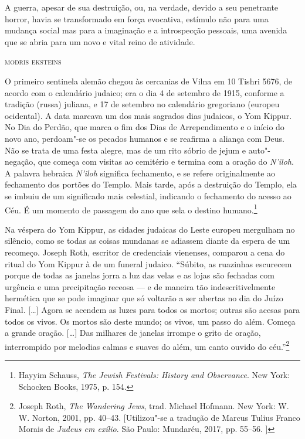 \epigraph{A guerra, apesar de sua destruição, ou, na verdade, devido a seu
penetrante horror, havia se transformado em força evocativa, estímulo
não para uma mudança social mas para a imaginação e a introspecção
pessoais, uma avenida que se abria para um novo e vital reino de
atividade.}{\textsc{modris eksteins}}

O primeiro sentinela alemão chegou às cercanias de Vilna em 10 Tishri
5676, de acordo com o calendário judaico; era o dia 4 de setembro de
1915, conforme a tradição (russa) juliana, e 17 de setembro no
calendário gregoriano (europeu ocidental). A data marcava um dos mais
sagrados dias judaicos, o Yom Kippur. No Dia do Perdão, que marca o fim
dos Dias de Arrependimento e o início do novo ano, perdoam"-se os pecados
humanos e se reafirma a aliança com Deus. Não se trata de uma festa
alegre, mas de um rito sóbrio de jejum e auto"-negação, que começa com
visitas ao cemitério e termina com a oração do \emph{N'iloh}. A palavra
hebraica \emph{N'iloh} significa fechamento, e se refere originalmente
ao fechamento dos portões do Templo. Mais tarde, após a destruição do
Templo, ela se imbuiu de um significado mais celestial, indicando o
fechamento do acesso ao Céu. É um momento de passagem do ano que sela o
destino humano.\footnote{Hayyim Schauss, \emph{The Jewish Festivals:
  History and Observance}. New York: Schocken Books, 1975, p. 154.}

Na véspera do Yom Kippur, as cidades judaicas do Leste europeu mergulham
no silêncio, como se todas as coisas mundanas se adiassem diante da
espera de um recomeço. Joseph Roth, escritor de credenciais vienenses,
comparou a cena do ritual do Yom Kippur à de um funeral judaico.
``Súbito, as ruazinhas escurecem porque de todas as janelas jorra a luz
das velas e as lojas são fechadas com urgência e uma precipitação
receosa --- e de maneira tão indescritivelmente hermética que se pode
imaginar que só voltarão a ser abertas no dia do Juízo Final.
{[}\ldots{}{]} Agora se acendem as luzes para todos os mortos; outras
são acesas para todos os vivos. Os mortos são deste mundo; os vivos, um
passo do além. Começa a grande oração. {[}\ldots{}{]} Das milhares de
janelas irrompe o grito de oração, interrompido por melodias calmas e
suaves do além, um canto ouvido do céu.''\footnote{Joseph Roth,
  \emph{The Wandering Jews}, trad. Michael Hofmann. New York: W.\,W.
  Norton, 2001, pp. 40--43. [Utilizou"-se a tradução de Marcus Tulius
  Franco Morais de \emph{Judeus em exílio}. São Paulo: Mundaréu, 2017,
  pp. 55--56. ]}


